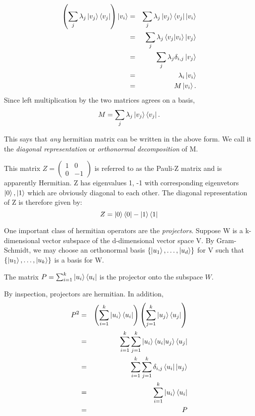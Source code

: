 {\begin{eqnarray}
\left(\sum\limits_j \lambda_j\ket{v_j}\bra{v_j}\right)\ket{v_i}&=&\sum\limits_j \lambda_j\ket{v_j}\bra{v_j}\ket{v_i}\\
&=&\sum\limits_j \lambda_j\braket{v_j|v_i}\ket{v_j}\\
&=&\sum\limits_j \lambda_j\delta_{i,j}\ket{v_j}\\
&=&\lambda_i\ket{v_i}\\
&=&M\ket{v_i}.\\
\end{eqnarray}
Since left multiplication by the two matrices agrees on a basis,
\begin{equation}
M=\sum\limits_j \lambda_j \ket{v_j}\bra{v_j}.    
\end{equation}

This says that {\emph{any}} hermitian matrix can be written in the above form. We call it the \textit{diagonal representation} or \textit{orthonormal decomposition} of M.
\begin{example} \label{example-pauli z diagonal rep}
This matrix $Z=\left(\begin{smallmatrix}
    1 & 0\\
    0 & -1
    \end{smallmatrix}\right)$
    is referred to as the Pauli-Z matrix and is apparently Hermitian. Z has eigenvalues 1, -1 with corresponding eigenvetors $\ket{0}, \ket{1}$ which are obviously diagonal to each other. The diagonal representation of Z is therefore given by:
\begin{equation}
    Z=\ket{0}\bra{0}-\ket{1}\bra{1}
\end{equation}
\end{example}

One important class of hermitian operators are the \textit{projectors}. Suppose W is a k-dimensional vector subspace of the d-dimensional vector space V. By Gram-Schmidt, we may choose an orthonormal basis $\{\ket{u_1}, \hdots, \ket{u_d}\}$ for V such that $\{\ket{u_1}, \hdots, \ket{u_k}\}$ is a basis for W.  
\begin{definition}
The matrix $P=\sum_{i=1}^k \ket{u_i} \bra{u_i}$ is the projector onto the subspace $W$.
\end{definition}
By inspection, projectors are hermitian.  In addition,
\begin{eqnarray}
    P^2&=&\left(\sum_{i=1}^k \ket{u_i} \bra{u_i}\right)\left(\sum_{j=1}^k \ket{u_j} \bra{u_j}\right)\\
    &=&\sum_{i=1}^k \sum_{j=1}^k \ket{u_i} \braket{u_i|u_j} \bra{u_j}\\
    &=&\sum_{i=1}^k \sum_{j=1}^k\delta_{i,j}\bra{u_i}\ket{u_j}\\
    &=&\sum_{i=1}^k \ket{u_i} \bra{u_i}\\
    &=&P
    \end{eqnarray}

}

